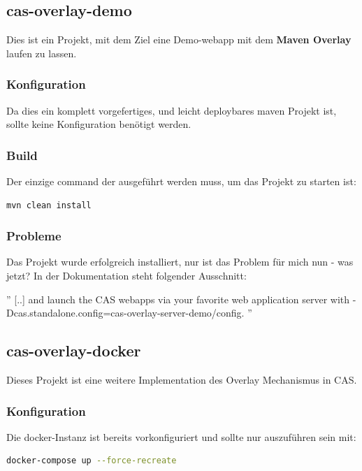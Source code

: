 \subsection{cas-overlay-demo}
\cite{Casinthecloud}

Dies ist ein Projekt, mit dem Ziel eine Demo-webapp mit dem \textbf{Maven Overlay} laufen zu lassen.

\subsubsection{Konfiguration}
Da dies ein komplett vorgefertiges, und leicht deploybares maven Projekt ist, sollte keine Konfiguration benötigt werden.

\clearpage
\subsubsection{Build}
Der einzige command der ausgeführt werden muss, um das Projekt zu starten ist:

\begin{lstlisting}[language=bash]
mvn clean install
\end{lstlisting}

\subsubsection{Probleme}
Das Projekt wurde erfolgreich installiert, nur ist das Problem für mich nun - was jetzt?
In der Dokumentation steht folgender Ausschnitt:

''
[..] and launch the CAS webapps via your favorite web application server with -Dcas.standalone.config=cas-overlay-server-demo/config.
''

\subsection{cas-overlay-docker}
\cite{Crpeck}

Dieses Projekt ist eine weitere Implementation des Overlay Mechanismus in CAS.

\subsubsection{Konfiguration}
Die docker-Instanz ist bereits vorkonfiguriert und sollte nur auszuführen sein mit:

\begin{lstlisting}[language=bash]
	docker-compose up --force-recreate
\end{lstlisting}

